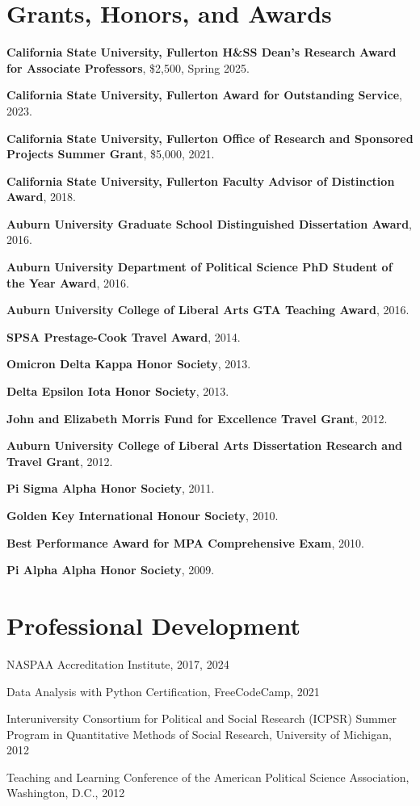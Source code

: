 \documentclass[12pt,letterpaper]{article}
\renewenvironment{itemize}{
  \begin{list}{}{
    \setlength{\leftmargin}{1.5em}
    \setlength{\itemsep}{0.25em}
    \setlength{\parskip}{0pt}
    \setlength{\parsep}{0.25em}
  }
}{
  \end{list}
}
\begin{document}
  \section*{Grants, Honors, and Awards}
  \begin{itemize}\leftmargin=2pt\itemindent=-15pt
    \item \textbf{California State University, Fullerton H\&SS Dean's Research Award for Associate Professors}, \$2,500, Spring 2025.
    \item \textbf{California State University, Fullerton Award for Outstanding Service}, 2023.
    \item \textbf{California State University, Fullerton Office of Research and Sponsored Projects Summer Grant}, \$5,000, 2021.
    \item \textbf{California State University, Fullerton Faculty Advisor of Distinction Award}, 2018.
    \item \textbf{Auburn University Graduate School Distinguished Dissertation Award}, 2016.
    \item \textbf{Auburn University Department of Political Science PhD Student of the Year Award}, 2016.
    \item \textbf{Auburn University College of Liberal Arts GTA Teaching Award}, 2016.
    \item \textbf{SPSA Prestage-Cook Travel Award}, 2014.
    \item \textbf{Omicron Delta Kappa Honor Society}, 2013.
    \item \textbf{Delta Epsilon Iota Honor Society}, 2013.
    \item \textbf{John and Elizabeth Morris Fund for Excellence Travel Grant}, 2012.
    \item \textbf{Auburn University College of Liberal Arts Dissertation Research and Travel Grant}, 2012.
    \item \textbf{Pi Sigma Alpha Honor Society}, 2011.
    \item \textbf{Golden Key International Honour Society}, 2010.
    \item \textbf{Best Performance Award for MPA Comprehensive Exam}, 2010.
    \item \textbf{Pi Alpha Alpha Honor Society}, 2009.
  \end{itemize}

\section*{Professional Development}
\begin{itemize}\leftmargin=2pt\itemindent=-15pt
  \item NASPAA Accreditation Institute, 2017, 2024
  \item Data Analysis with Python Certification, FreeCodeCamp, 2021
  \item Interuniversity Consortium for Political and Social Research (ICPSR) Summer Program in Quantitative Methods of Social Research, University of Michigan, 2012
  \item Teaching and Learning Conference of the American Political Science Association, Washington, D.C., 2012
\end{itemize}
\end{document}

